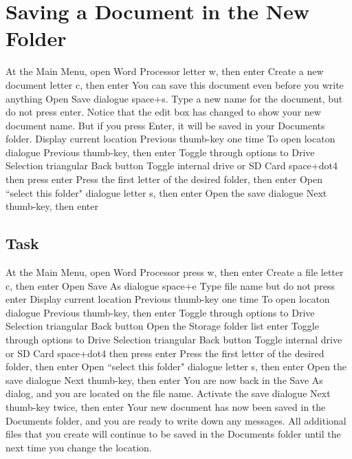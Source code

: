 \documentclass[10pt,letterpaper,twoside]{report}
\begin{document}
{{{\section{Saving a Document in the New Folder}
	At the Main Menu, open Word Processor \dotfill letter w, then enter
	Create a new document \dotfill letter c, then enter
	You can save this document even before you write anything
		Open Save dialogue \dotfill space+s.
			Type a new name for the document, but do not press enter. Notice that the edit box has changed to show your new document name. But if you press Enter, it will be saved in your Documents folder.
		Display current location \dotfill Previous thumb-key one time
		To open locaton dialogue \dotfill Previous thumb-key, then enter
		Toggle through options to Drive Selection \dotfill triangular Back button
			Toggle internal drive or SD Card \dotfill space+dot4 then press enter
			Press the first letter of the desired folder, then enter
			Open ``select this folder" dialogue \dotfill letter s, then enter
			Open the save dialogue \dotfill Next thumb-key, then enter
\subsection{Task}
	At the Main Menu, open Word Processor \dotfill press w, then enter 
	Create a file \dotfill letter c, then enter
	Open Save As dialogue \dotfill space+e
	Type file name but do not press enter 
	Display current location \dotfill Previous thumb-key one time
	To open locaton dialogue \dotfill Previous thumb-key, then enter
	Toggle through options to Drive Selection \dotfill triangular Back button
		Open the Storage folder list \dotfill enter
	Toggle through options to Drive Selection \dotfill triangular Back button
			Toggle internal drive or SD Card \dotfill space+dot4 then press enter
			Press the first letter of the desired folder, then enter
			Open ``select this folder" dialogue \dotfill letter s, then enter
			Open the save dialogue \dotfill Next thumb-key, then enter
	You are now back in the Save As dialog, and you are located on the file name.
	Activate the save dialogue \dotfill Next thumb-key twice, then enter
	Your new document has now been saved in the Documents folder, and you are ready to write down any messages.
	All additional files that you create will continue to be saved in the Documents folder until the next time you change the location.
}}}
\end{document}

